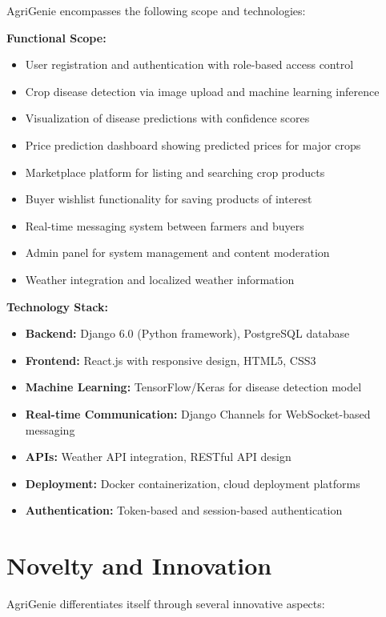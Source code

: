 \documentclass[12pt,a4paper]{report}
\begin{document}
AgriGenie encompasses the following scope and technologies:

\textbf{Functional Scope:}
\begin{itemize}
    \item User registration and authentication with role-based access control
    \item Crop disease detection via image upload and machine learning inference
    \item Visualization of disease predictions with confidence scores
    \item Price prediction dashboard showing predicted prices for major crops
    \item Marketplace platform for listing and searching crop products
    \item Buyer wishlist functionality for saving products of interest
    \item Real-time messaging system between farmers and buyers
    \item Admin panel for system management and content moderation
    \item Weather integration and localized weather information
\end{itemize}

\textbf{Technology Stack:}
\begin{itemize}
    \item \textbf{Backend:} Django 6.0 (Python framework), PostgreSQL database
    \item \textbf{Frontend:} React.js with responsive design, HTML5, CSS3
    \item \textbf{Machine Learning:} TensorFlow/Keras for disease detection model
    \item \textbf{Real-time Communication:} Django Channels for WebSocket-based messaging
    \item \textbf{APIs:} Weather API integration, RESTful API design
    \item \textbf{Deployment:} Docker containerization, cloud deployment platforms
    \item \textbf{Authentication:} Token-based and session-based authentication
\end{itemize}

\section{Novelty and Innovation}

AgriGenie differentiates itself through several innovative aspects:
\end{document}

